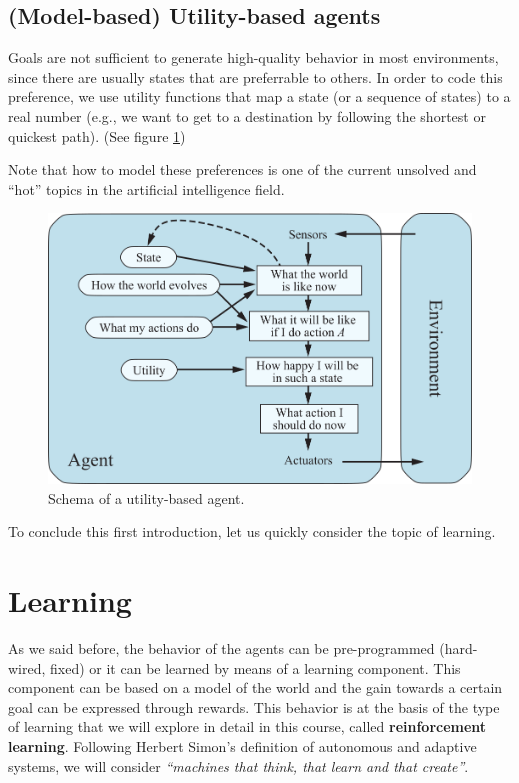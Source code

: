\subsection{(Model-based) Utility-based agents}
Goals are not sufficient to generate high-quality behavior in most environments, since there are usually states that are preferrable to others. In order to code this preference, we use utility functions that map a state (or a sequence of states) to a real number (e.g., we want to get to a destination by following the shortest or quickest path). (See figure \ref{fig:ch1-utilitybasedagent})

Note that how to model these preferences is one of the current unsolved and “hot” topics in the artificial intelligence field.

\begin{figure}[hbtp]
    \centering
    \includegraphics{Images/Chapter 1/utility-based-agent.png}
    \caption{Schema of a utility-based agent.}
    \label{fig:ch1-utilitybasedagent}
\end{figure}

To conclude this first introduction, let us quickly consider the topic of learning.

\section{Learning}
As we said before, the behavior of the agents can be pre-programmed (hard-wired, fixed) or it can be learned by means of a learning component. This component can be based on a model of the world and the gain towards a certain goal can be expressed through rewards. This behavior is at the basis of the type of learning that we will explore in detail in this course, called \textbf{reinforcement learning}. Following Herbert Simon’s definition of autonomous and adaptive systems, we will consider \textit{``machines that think, that learn and that create''}.